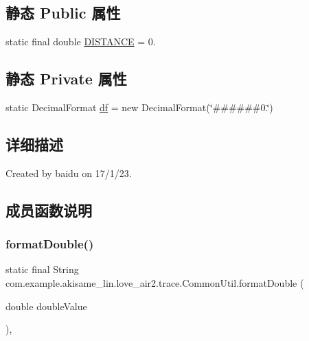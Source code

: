 \subsection*{静态 Public 属性}
\begin{DoxyCompactItemize}
\item 
static final double \mbox{\hyperlink{classcom_1_1example_1_1akisame__lin_1_1love__air2_1_1trace_1_1_common_util_a4cbb88148527244a8dfe72f57950d373}{D\+I\+S\+T\+A\+N\+CE}} = 0.
\end{DoxyCompactItemize}
\subsection*{静态 Private 属性}
\begin{DoxyCompactItemize}
\item 
static Decimal\+Format \mbox{\hyperlink{classcom_1_1example_1_1akisame__lin_1_1love__air2_1_1trace_1_1_common_util_ad4241a8c0a20ae92c1da0cd7c5d3b05a}{df}} = new Decimal\+Format(\char`\"{}\#\#\#\#\#\#0.\char`\"{})
\end{DoxyCompactItemize}


\subsection{详细描述}
Created by baidu on 17/1/23. 

\subsection{成员函数说明}
\mbox{\label{classcom_1_1example_1_1akisame__lin_1_1love__air2_1_1trace_1_1_common_util_ac6c3d702391714401c86dfe92bbf2cc9}} 
\subsubsection{\texorpdfstring{formatDouble()}{formatDouble()}}
{\footnotesize\ttfamily static final String com.\+example.\+akisame\+\_\+lin.\+love\+\_\+air2.\+trace.\+Common\+Util.\+format\+Double (\begin{DoxyParamCaption}\item[{double}]{double\+Value }\end{DoxyParamCaption})\hspace{0.3cm}{\ttfamily [inline]}, {\ttfamily [static]}}

